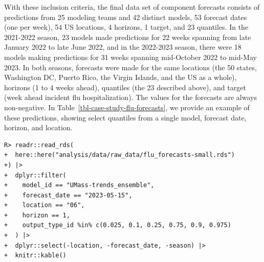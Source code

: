 \documentclass[
  article,
  shortnames,
  notitle]{jss}
\begin{document}
With these inclusion criteria, the final data set of component forecasts
consists of predictions from 25 modeling teams and 42 distinct models,
53 forecast dates (one per week), 54 US locations, 4 horizons, 1 target,
and 23 quantiles. In the 2021-2022 season, 23 models made predictions
for 22 weeks spanning from late January 2022 to late June 2022, and in
the 2022-2023 season, there were 18 models making predictions for 31
weeks spanning mid-October 2022 to mid-May 2023. In both seasons,
forecasts were made for the same locations (the 50 states, Washington
DC, Puerto Rico, the Virgin Islands, and the US as a whole), horizons (1
to 4 weeks ahead), quantiles (the 23 described above), and target (week
ahead incident flu hospitalization). The values for the forecasts are
always non-negative. In Table~\ref{tbl-case-study-flu-forecasts}, we
provide an example of these predictions, showing select quantiles from a
single model, forecast date, horizon, and location.

\begin{verbatim}
R> readr::read_rds(
+  here::here("analysis/data/raw_data/flu_forecasts-small.rds")
+) |>
+  dplyr::filter(
+    model_id == "UMass-trends_ensemble",
+    forecast_date == "2023-05-15",
+    location == "06",
+    horizon == 1,
+    output_type_id %in% c(0.025, 0.1, 0.25, 0.75, 0.9, 0.975)
+  ) |>
+  dplyr::select(-location, -forecast_date, -season) |>
+  knitr::kable()
\end{verbatim}
\end{document}
